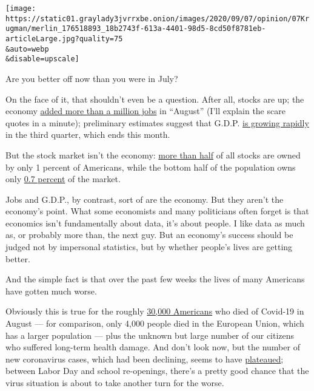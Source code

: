 \texttt{[image: https://static01.graylady3jvrrxbe.onion/images/2020/09/07/opinion/07Krugman/merlin\_176518893\_18b2743f-613a-4401-98d5-8cd50f8781eb-articleLarge.jpg?quality=75\\\&auto=webp\\\&disable=upscale]}

Are you better off now than you were in July?

On the face of it, that shouldn't even be a question. After all, stocks
are up; the economy
\href{https://www.nytimes3xbfgragh.onion/2020/09/04/business/economy/jobs-report.html}{added
more than a million jobs} in ``August'' (I'll explain the scare quotes
in a minute); preliminary estimates suggest that G.D.P.
\href{https://www.calculatedriskblog.com/2020/09/q3-gdp-forecasts.html}{is
growing rapidly} in the third quarter, which ends this month.

But the stock market isn't the economy:
\href{https://fred.stlouisfed.org/series/WFRBST01122}{more than half} of
all stocks are owned by only 1 percent of Americans, while the bottom
half of the population owns only
\href{https://fred.stlouisfed.org/series/WFRBSB50203}{0.7 percent} of
the market.

Jobs and G.D.P., by contrast, sort of are the economy. But they aren't
the economy's point. What some economists and many politicians often
forget is that economics isn't fundamentally about data, it's about
people. I like data as much as, or probably more than, the next guy. But
an economy's success should be judged not by impersonal statistics, but
by whether people's lives are getting better.

And the simple fact is that over the past few weeks the lives of many
Americans have gotten much worse.

Obviously this is true for the roughly
\href{https://ourworldindata.org/coronavirus-data-explorer?zoomToSelection=true\&year=latest\&time=2020-03-01..2020-09-06\&country=USA~EuropeanUnion\&region=World\&deathsMetric=true\&interval=total\&smoothing=0\&pickerMetric=total_deaths\&pickerSort=desc}{30,000
Americans} who died of Covid-19 in August --- for comparison, only 4,000
people died in the European Union, which has a larger population ---
plus the unknown but large number of our citizens who suffered long-term
health damage. And don't look now, but the number of new coronavirus
cases, which had been declining, seems to have
\href{https://covidtracking.com/data/charts/us-daily-positive}{plateaued};
between Labor Day and school re-openings, there's a pretty good chance
that the virus situation is about to take another turn for the worse.

